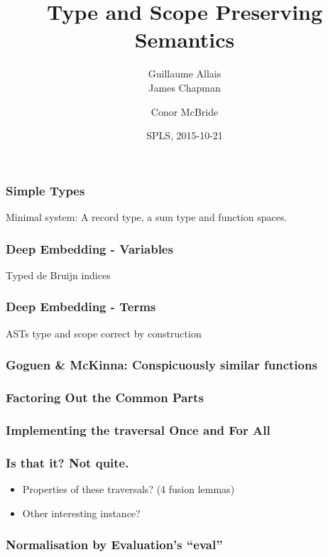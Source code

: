\documentclass[xetex, mathserif, serif]{beamer}
\title{Type and Scope Preserving Semantics}
\author[me]{Guillaume Allais\\[1em] James Chapman \and Conor McBride}
\institute{University of Strathclyde}
\date{SPLS, 2015-10-21}
\begin{document}
 
  \begin{frame}
    \titlepage
  \end{frame}

  \begin{frame}\frametitle{Simple Types}
    Minimal system: A record type, a sum type and function spaces.

    \unskip
    \unskip
  \end{frame}

  \begin{frame}\frametitle{Deep Embedding - Variables}
    Typed de Bruijn indices

    \unskip
  \end{frame}
  \begin{frame}\frametitle{Deep Embedding - Terms}
    ASTs type and scope correct by construction

    \unskip
  \end{frame}

  \begin{frame}\frametitle{Goguen \& McKinna: Conspicuously similar functions}
    \unskip
    \unskip
  \end{frame}

  \begin{frame}\frametitle{Factoring Out the Common Parts}
    \unskip
  \end{frame}

  \begin{frame}\frametitle{Implementing the traversal Once and For All}
    \unskip
    \unskip
  \end{frame}

  \begin{frame}\frametitle{Is that it? Not quite.}
    \begin{itemize}
      \item Properties of these traversals? (4 fusion lemmas)
      \item Other interesting instance?
    \end{itemize}
  \end{frame}

  \begin{frame}\frametitle{Normalisation by Evaluation's ``eval''}
  \end{frame}
\end{document}
